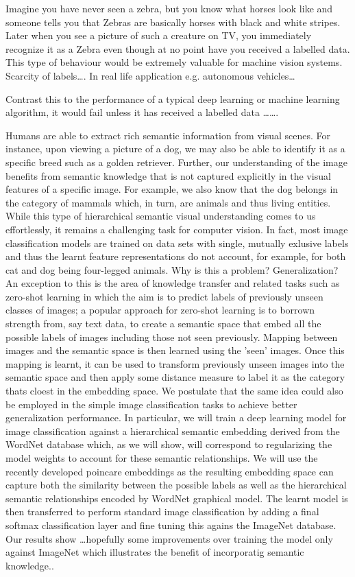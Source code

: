\documentclass[12pt]{report}
\begin{document}
Imagine you have never seen a zebra, but you know what horses look like and someone tells you that Zebras are basically horses with black and white stripes. Later when you see a picture of such a creature on TV, you immediately recognize it as a Zebra even though at no point have you received a labelled data. This type of behaviour would be extremely valuable for machine vision systems. Scarcity of labels\dots. In real life application e.g. autonomous vehicles\dots


Contrast this to the performance of a typical deep learning or machine learning algorithm, it would fail unless it has received a labelled data \dots\dots.


Humans are able to extract rich semantic information from visual scenes. For instance, upon viewing a picture of a dog, we may also be able to identify it as a specific breed such as a golden retriever. Further, our understanding of the image benefits from semantic knowledge that is not captured explicitly in the visual features of a specific image. For example, we also know that the dog belongs in the category of mammals which, in turn, are animals and thus living entities. While this type of hierarchical semantic visual understanding comes to us effortlessly, it remains a challenging task for computer vision. In fact, most image classification models are trained on data sets with single, mutually exlusive labels and thus the learnt feature representations do not account, for example, for both cat and dog being four-legged animals. Why is this a problem? Generalization?  An exception to this is the area of knowledge transfer and related tasks such as zero-shot learning in which the aim is to predict labels of previously unseen classes of images; a popular approach for zero-shot learning is to borrown strength from, say text data, to create a semantic space that embed all the possible labels of images including those not seen previously. Mapping between images and the semantic space is then learned using the 'seen' images. Once this mapping is learnt, it can be used to transform previously unseen images into the semantic space and then apply some distance measure to label it as the category thats cloest in the embedding space. We postulate that the same idea could also be employed in the simple image classification tasks to achieve better generalization performance. In particular, we will train a deep learning model for image classification against a hierarchical semantic embedding derived from the WordNet database which, as we will show, will correspond to regularizing the model weights to account for these semantic relationships. We will use the recently developed poincare embeddings as the resulting embedding space can capture both the similarity between the possible labels as well as the hierarchical semantic relationships encoded by WordNet graphical model. The learnt model is then transferred to perform standard image classification by adding a final softmax classification layer and fine tuning this agains the ImageNet database. Our results show \dots hopefully some improvements over training the model only against ImageNet which illustrates the benefit of incorporatig semantic knowledge.. \\
\end{document}
